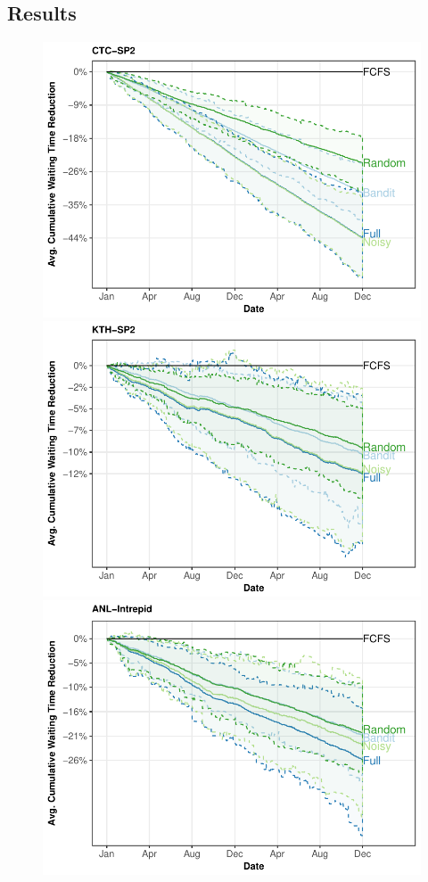 \documentclass[sigconf]{acmart}
\begin{document}
\subsection{Results}
\label{sub:results}

\begin{figure}[h]
  \centering
  \includegraphics[scale=0.6]{figures/CTC-SP2.pdf}
  \includegraphics[scale=0.6]{figures/KTH-SP2.pdf}\\
  \includegraphics[scale=0.6]{figures/CEA-Curi.pdf}

\end{figure}
\end{document}
